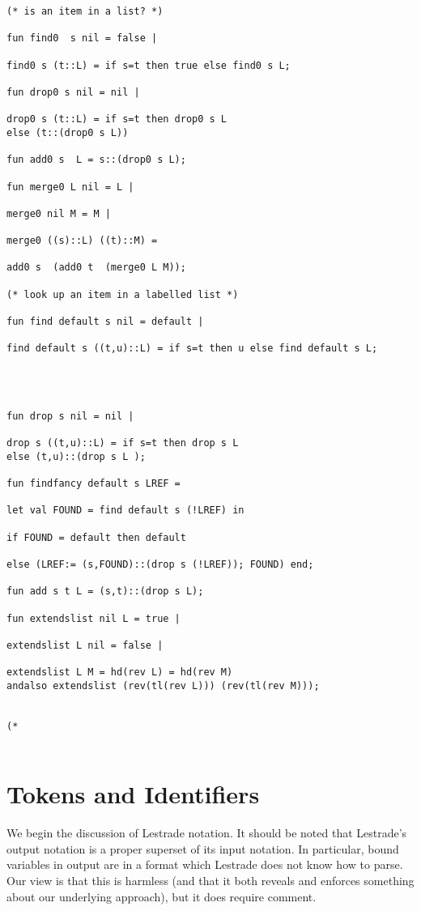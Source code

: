 \documentclass[12pt]{article}
\begin{document}
\begin{verbatim}
(* is an item in a list? *)

fun find0  s nil = false |

find0 s (t::L) = if s=t then true else find0 s L;

fun drop0 s nil = nil |

drop0 s (t::L) = if s=t then drop0 s L
else (t::(drop0 s L))

fun add0 s  L = s::(drop0 s L);

fun merge0 L nil = L |

merge0 nil M = M |

merge0 ((s)::L) ((t)::M) =

add0 s  (add0 t  (merge0 L M));

(* look up an item in a labelled list *)

fun find default s nil = default |

find default s ((t,u)::L) = if s=t then u else find default s L;




fun drop s nil = nil |

drop s ((t,u)::L) = if s=t then drop s L 
else (t,u)::(drop s L );

fun findfancy default s LREF =

let val FOUND = find default s (!LREF) in

if FOUND = default then default

else (LREF:= (s,FOUND)::(drop s (!LREF)); FOUND) end;

fun add s t L = (s,t)::(drop s L);

fun extendslist nil L = true |

extendslist L nil = false |

extendslist L M = hd(rev L) = hd(rev M)
andalso extendslist (rev(tl(rev L))) (rev(tl(rev M)));


(*


\end{verbatim}

\newpage


\section{Tokens and Identifiers}

We begin the discussion of Lestrade notation.  It should be noted that Lestrade's output notation is a proper superset of its input notation.  In particular, bound variables in output are in a format which Lestrade does not know how to parse.  Our view is that this is harmless (and that it both reveals and enforces something about our underlying approach), but it does require comment.
\end{document}
